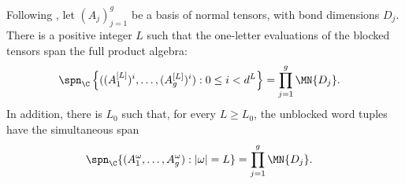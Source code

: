 \begin{lemma}
    \label{thm:cpsv_bnt_blocked_simultaneous_span}
    \leanok
    Following \cite[lines~317--345]{Cirac2016MPDO_arXiv}, let $(A_j)_{j=1}^g$
    be a basis of normal tensors, with bond dimensions $D_j$. There is a
    positive integer $L$ such that the one-letter evaluations of the blocked
    tensors span the full product algebra:
    \begin{align}
        \spn_{\C}\left\{((A_1^{[L]})^i,\ldots,(A_g^{[L]})^i)
        : 0\leq i<d^L\right\}
         & = \prod_{j=1}^g \MN{D_j}.
        \notag
    \end{align}
    In addition, there is $L_0$ such that, for every $L\geq L_0$, the
    unblocked word tuples have the simultaneous span
    \begin{align}
        \spn_{\C}\{(A_1^\omega,\ldots,A_g^\omega):|\omega|=L\}
         & =\prod_{j=1}^g\MN{D_j}.
        \notag
    \end{align}
\end{lemma}

